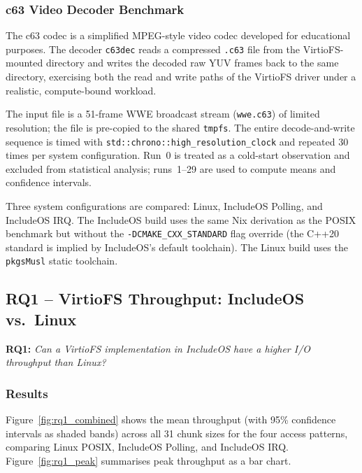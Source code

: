 \subsubsection{c63 Video Decoder Benchmark}
\label{sec:c63dec_setup}

The c63 codec is a simplified MPEG-style video codec developed for
educational purposes.  The decoder \texttt{c63dec} reads a compressed
\texttt{.c63} file from the VirtioFS-mounted directory and writes the
decoded raw YUV frames back to the same directory, exercising both the
read and write paths of the VirtioFS driver under a realistic,
compute-bound workload.

The input file is a 51-frame WWE broadcast stream (\texttt{wwe.c63}) of
limited resolution; the file is pre-copied to the shared \texttt{tmpfs}.
The entire decode-and-write sequence is timed with
\texttt{std::chrono::high\_resolution\_clock} and repeated 30 times per
system configuration.  Run~0 is treated as a cold-start observation and
excluded from statistical analysis; runs~1–29 are used to compute means
and confidence intervals.

Three system configurations are compared: Linux, IncludeOS Polling, and
IncludeOS IRQ.  The IncludeOS build uses the same Nix derivation as the
POSIX benchmark but without the \texttt{-DCMAKE\_CXX\_STANDARD} flag
override (the C++20 standard is implied by IncludeOS's default
toolchain).  The Linux build uses the \texttt{pkgsMusl} static toolchain.

\subsection{RQ1 – VirtioFS Throughput: IncludeOS vs.\ Linux}
\label{sec:rq1}

\textbf{RQ1:} \emph{Can a VirtioFS implementation in IncludeOS have a
higher I/O throughput than Linux?}

\subsubsection{Results}

Figure~\ref{fig:rq1_combined} shows the mean throughput (with 95\%
confidence intervals as shaded bands) across all 31 chunk sizes for the
four access patterns, comparing Linux POSIX, IncludeOS Polling, and
IncludeOS IRQ.  Figure~\ref{fig:rq1_peak} summarises peak throughput as
a bar chart.

